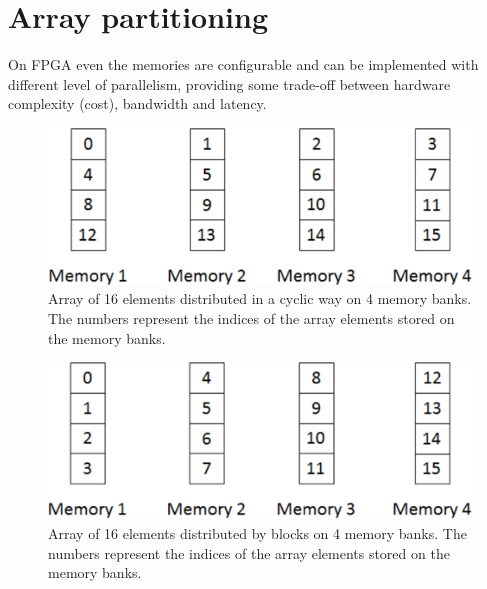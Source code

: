 \documentclass[sigplan, review, authordraft]{acmart}
\begin{document}
\section{Array partitioning}
\label{sec:array-partitioning}

On FPGA even the memories are configurable and can be implemented with
different level of parallelism, providing some trade-off between hardware
complexity (cost), bandwidth and latency.

\begin{figure}
  \includegraphics[width=\hsize]{Figures/cyclic_partition_array}
  \caption{Array of 16 elements distributed in a cyclic way on 4 memory
    banks. The numbers represent the indices of the array elements stored
    on the memory banks.}
\label{fig:cyclic-array}
\end{figure}

\begin{figure}
  \includegraphics[width=\hsize]{Figures/block_partition_array}
  \caption{Array of 16 elements distributed by blocks on 4 memory
    banks. The numbers represent the indices of the array elements stored
    on the memory banks.}
\label{fig:block-array}
\end{figure}
\end{document}
